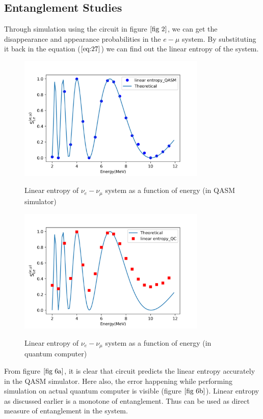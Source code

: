 \documentclass[12pt,a4paper]{report}
\begin{document}
\subsection{Entanglement Studies}
Through simulation using the circuit in figure $\ref{fig 2}$, we can get the disappearance and appearance probabilities in the $e-\mu$ system. By substituting it back in the equation ($\ref{eq:27}$) we can find out the linear entropy of the system.
\begin{figure}[H]
	\graphicspath{ {./Images/} }
	\centering	
	{\includegraphics[width=0.8\textwidth]{fig_6a.png}}
	\caption{Linear entropy of $\nu_{e}-\nu_{\mu}$ system as a function of energy (in QASM simulator)}
	\label{fig 6a}
\end{figure}
\begin{figure}[H]
	\graphicspath{ {./Images/} }
	\centering	
	{\includegraphics[width=0.8\textwidth]{fig_6b.png}}
	\caption{Linear entropy of $\nu_{e}-\nu_{\mu}$ system as a function of energy (in quantum computer)}
	\label{fig 6b}
\end{figure}
From figure $\ref{fig 6a}$, it is clear that circuit predicts the linear entropy accurately in the QASM simulator. Here also, the error happening while performing simulation on actual quantum computer is visible (figure $\ref{fig 6b}$). Linear entropy as discussed earlier is a monotone of entanglement. Thus can be used as direct measure of entanglement in the system. 
\end{document}
